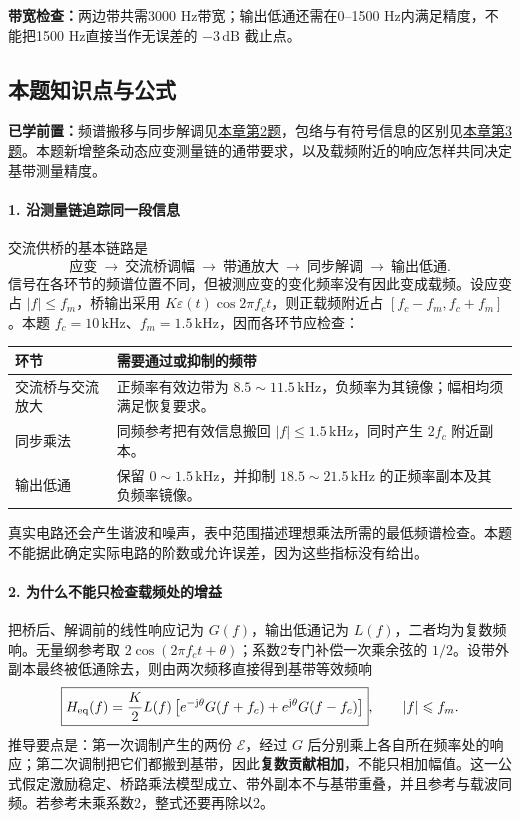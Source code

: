 \textbf{带宽检查：}两边带共需3000 Hz带宽；输出低通还需在0--1500 Hz内满足精度，不能把1500 Hz直接当作无误差的 $-3\,\mathrm{dB}$ 截止点。

\subsection*{本题知识点与公式}\label{kn:5-4}
\noindent\textbf{已学前置：}频谱搬移与同步解调见\hyperref[kn:5-2]{本章第2题}，包络与有符号信息的区别见\hyperref[kn:5-3]{本章第3题}。本题新增整条动态应变测量链的通带要求，以及载频附近的响应怎样共同决定基带测量精度。

\paragraph{1. 沿测量链追踪同一段信息}
交流供桥的基本链路是
\[
\text{应变}\ \longrightarrow\ \text{交流桥调幅}\
\longrightarrow\ \text{带通放大}\
\longrightarrow\ \text{同步解调}\
\longrightarrow\ \text{输出低通}.
\]
信号在各环节的频谱位置不同，但被测应变的变化频率没有因此变成载频。设应变占 $|f|\leq f_m$，桥输出采用 $K\varepsilon(t)\cos2\pi f_ct$，则正载频附近占 $[f_c-f_m,f_c+f_m]$。本题 $f_c=10\,\mathrm{kHz}$、$f_m=1.5\,\mathrm{kHz}$，因而各环节应检查：
\begin{center}\small
\begin{tabularx}{\linewidth}{@{}p{2.5cm}X@{}}
\toprule
环节 & 需要通过或抑制的频带\\
\midrule
交流桥与交流放大 & 正频率有效边带为 $8.5\sim11.5\,\mathrm{kHz}$，负频率为其镜像；幅相均须满足恢复要求。\\
同步乘法 & 同频参考把有效信息搬回 $|f|\leq1.5\,\mathrm{kHz}$，同时产生 $2f_c$ 附近副本。\\
输出低通 & 保留 $0\sim1.5\,\mathrm{kHz}$，并抑制 $18.5\sim21.5\,\mathrm{kHz}$ 的正频率副本及其负频率镜像。\\
\bottomrule
\end{tabularx}
\end{center}
真实电路还会产生谐波和噪声，表中范围描述理想乘法所需的最低频谱检查。本题不能据此确定实际电路的阶数或允许误差，因为这些指标没有给出。

\paragraph{2. 为什么不能只检查载频处的增益}
把桥后、解调前的线性响应记为 $G(f)$，输出低通记为 $L(f)$，二者均为复数频响。无量纲参考取 $2\cos(2\pi f_ct+\theta)$；系数2专门补偿一次乘余弦的 $1/2$。设带外副本最终被低通除去，则由两次频移直接得到基带等效频响
\[
\boxed{
H_{\mathrm{eq}}(f)=\frac K2 L(f)
\left[e^{-\mathrm{j}\theta}G(f+f_c)+e^{\mathrm{j}\theta}G(f-f_c)\right]
},\qquad |f|\leqslant f_m.
\]
推导要点是：第一次调制产生的两份 $\mathcal E$，经过 $G$ 后分别乘上各自所在频率处的响应；第二次调制把它们都搬到基带，因此\textbf{复数贡献相加}，不能只相加幅值。这一公式假定激励稳定、桥路乘法模型成立、带外副本不与基带重叠，并且参考与载波同频。若参考未乘系数2，整式还要再除以2。

